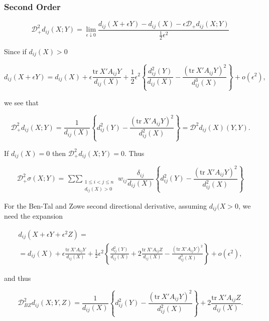 \documentclass[
  12pt,
]{book}
\theoremstyle{definition}
\theoremstyle{definition}
\theoremstyle{definition}
\theoremstyle{definition}
\theoremstyle{remark}
\begin{document}
\hypertarget{second-order-1}{%
\subsubsection{Second Order}\label{second-order-1}}

\begin{equation}
\mathcal{D}_+^2d_{ij}(X;Y)=\lim_{\epsilon\downarrow 0}\frac{d_{ij}(X+\epsilon Y)-d_{ij}(X)-\epsilon \mathcal{D}_+d_{ij}(X;Y)}{\frac12\epsilon^2}
\label{eq:d2dinidef}
\end{equation}

Since if \(d_{ij}(X)>0\)

\begin{equation}
d_{ij}(X+\epsilon Y)=d_{ij}(X)+\epsilon\frac{\text{tr}\ X'A_{ij}Y}{d_{ij}(X)}+\frac12\epsilon^2\left\{\frac{d_{ij}^2(Y)}{d_{ij}(X)}-
\frac{(\text{tr}\ X'A_{ij}Y)^2}{d_{ij}^3(X)}\right\}+o(\epsilon^2),
\label{eq:d2dinidexp}
\end{equation}

we see that

\begin{equation}
\mathcal{D}_+^2d_{ij}(X;Y)=\frac{1}{d_{ij}(X)}\left\{d_{ij}^2(Y)-
\frac{(\text{tr}\ X'A_{ij}Y)^2}{d_{ij}^2(X)}\right\}=
\mathcal{D}^2d_{ij}(X)(Y,Y).
\label{eq:d2dinid}
\end{equation}

If \(d_{ij}(X)=0\) then \(\mathcal{D}_+^2d_{ij}(X;Y)=0\). Thus

\[
\mathcal{D}_+^2\sigma(X;Y)=\mathop{\sum\sum}_{\substack{{1\leq i<j\leq n}\\d_{ij}(X)>0}} w_{ij}\frac{\delta_{ij}}{d_{ij}(X)}\left\{d_{ij}^2(Y)-
\frac{(\text{tr}\ X'A_{ij}Y)^2}{d_{ij}^2(X)}\right\}
\]

For the Ben-Tal and Zowe second directional derivative, assuming \(d_{ij}(X>0\), we need the expansion

\begin{multline}
d_{ij}(X+\epsilon Y+\epsilon^2 Z)=\\
=d_{ij}(X)+\epsilon\frac{\text{tr}\ X'A_{ij}Y}{d_{ij}(X)}+\frac12\epsilon^2\left\{\frac{d_{ij}^2(Y)}{d_{ij}(X)}+2\frac{\text{tr}\ X'A_{ij}Z}{d_{ij}(X)}-\frac{(\text{tr}\ X'A_{ij}Y)^2}{d_{ij}^3(X)}\right\}+o(\epsilon^2),
\label{eq:propbzdexp}
\end{multline}

and thus

\begin{equation}
\mathcal{D}^2_{BZ}d_{ij}(X;Y,Z)=\frac{1}{d_{ij}(X)}\left\{d_{ij}^2(Y)-\frac{(\text{tr}\ X'A_{ij}Y)^2}{d_{ij}^2(X)}\right\}+2\frac{\text{tr}\ X'A_{ij}Z}{d_{ij}(X)}.
\label{eq:propbzd}
\end{equation}
\end{document}
